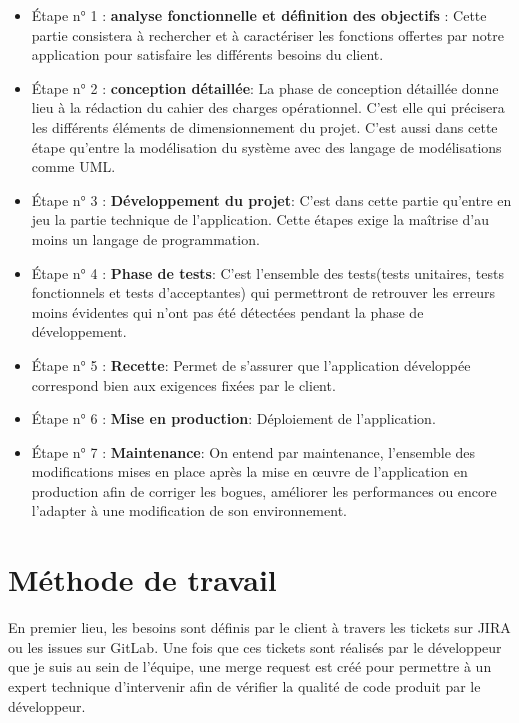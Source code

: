 	\begin{itemize}
		\item Étape n° 1 : \textbf{analyse fonctionnelle et définition des objectifs} : Cette partie consistera à rechercher et à caractériser les fonctions offertes par notre application pour satisfaire les différents besoins du client.\\
		\item Étape n° 2 : \textbf{conception détaillée}: La phase de conception détaillée donne lieu à la rédaction du cahier des charges opérationnel. C'est elle qui précisera les différents éléments de dimensionnement du projet.\cite{planification} C'est aussi dans cette étape qu'entre la modélisation du système avec des langage de modélisations comme UML.\\
		\item Étape n° 3 : \textbf{Développement du projet}: C'est dans cette  partie qu'entre en jeu la partie technique de l'application. Cette étapes exige la maîtrise d'au moins un langage de programmation.\\
		\item Étape n° 4 : \textbf{Phase de tests}:
		C'est l'ensemble des tests(tests unitaires, tests fonctionnels et tests d'acceptantes) qui permettront de retrouver les erreurs moins évidentes qui n'ont pas été détectées pendant la phase de développement.\\
		\item Étape n° 5 : \textbf{Recette}: Permet de s'assurer que l'application développée correspond bien aux exigences fixées par le client.\\
		\item Étape n° 6 : \textbf{Mise en production}: Déploiement de l'application.\\
		\item Étape n° 7 : \textbf{Maintenance}: On entend par maintenance, l'ensemble des modifications mises en place après la mise en œuvre de l'application en production afin de corriger les bogues, améliorer les performances ou encore l'adapter à une modification de son environnement.\cite{planification}
	\end{itemize}

	\section{Méthode de travail}
		En premier lieu, les besoins sont définis par le client à travers les tickets sur JIRA ou les issues sur GitLab. Une fois que ces tickets sont réalisés par le développeur que je suis au sein de l'équipe, une merge request est créé pour permettre à un expert technique d'intervenir afin de vérifier la qualité de code produit par le développeur.\\
		
